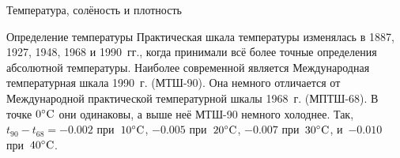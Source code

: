 \begin{chapter}{Температура, солёность и плотность}
\begin{section}{Определение температуры}
Практическая шкала температуры изменялась в 1887, 1927, 1948, 1968 и
1990~гг., когда принимали всё более точные определения абсолютной
температуры. Наиболее современной является Международная температурная
шкала 1990~г. (МТШ-90). Она немного отличается от Международной практической
температурной шкалы 1968~г. (МПТШ-68). В точке ${0}^\circ\mbox{C}$ они одинаковы, 
а выше неё МТШ-90 немного холоднее. Так, $t_{90}-t_{68} = -0.002$ 
при~${10}^\circ\mbox{C}$, $-0.005$ при~${20}^\circ\mbox{C}$, $-0.007$ при~${30}^\circ\mbox{C}$, 
и~$-0.010$ при~${40}^\circ\mbox{C}$. 
%
%


\end{section}
\end{chapter}
